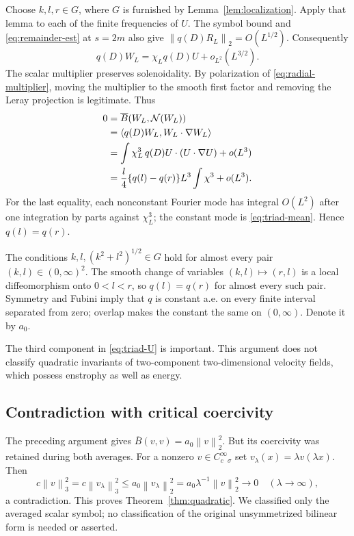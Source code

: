 \documentclass[11pt]{article}
\theoremstyle{remark}
\newcommand{\N}{\mathcal N}
\newcommand{\norm}[1]{\left\lVert#1\right\rVert}
\newcommand{\ip}[2]{\left\langle#1,#2\right\rangle}
\begin{document}
Choose $k,l,r\in G$, where $G$ is furnished by
Lemma~\ref{lem:localization}. Apply that lemma to each of the finite
frequencies of $U$. The symbol bound and \eqref{eq:remainder-est} at
$s=2m$ also give $\norm{q(D)R_L}_2=O(L^{1/2})$. Consequently
\begin{equation}
 q(D)W_L=\chi_Lq(D)U+o_{L^2}(L^{3/2}).\label{eq:main-localized}
\end{equation}
The scalar multiplier preserves solenoidality. By polarization of
\eqref{eq:radial-multiplier}, moving the multiplier to the smooth first
factor and removing the Leray projection is legitimate. Thus
\begin{align}
 0&=\overline B(W_L,\N(W_L))\notag\\
  &=\ip{q(D)W_L}{W_L\cdot\nabla W_L}\notag\\
  &=\int\chi_L^3\,q(D)U\cdot(U\cdot\nabla U)+o(L^3)\notag\\
  &=\frac l4\{q(l)-q(r)\}L^3\int\chi^3+o(L^3).
 \label{eq:triad-conclusion}
\end{align}
For the last equality, each nonconstant Fourier mode has integral
$O(L^2)$ after one integration by parts against $\chi_L^3$; the constant
mode is \eqref{eq:triad-mean}. Hence $q(l)=q(r)$.

The conditions $k,l,(k^2+l^2)^{1/2}\in G$ hold for almost every pair
$(k,l)\in(0,\infty)^2$. The smooth change of variables
$(k,l)\mapsto(r,l)$ is a local diffeomorphism onto $0<l<r$, so
$q(l)=q(r)$ for almost every such pair. Symmetry and Fubini imply that
$q$ is constant a.e. on every finite interval separated from zero;
overlap makes the constant the same on $(0,\infty)$. Denote it by $a_0$.

The third component in \eqref{eq:triad-U} is important. This argument does
not classify quadratic invariants of two-component two-dimensional
velocity fields, which possess enstrophy as well as energy.

\subsection{Contradiction with critical coercivity}
The preceding argument gives $\overline B(v,v)=a_0\norm v_2^2$. But its
coercivity was retained during both averages. For a nonzero
$v\in C_c^\infty{}_\sigma$ set $v_\lambda(x)=\lambda v(\lambda x)$. Then
\begin{equation}
 c\norm v_3^2=c\norm{v_\lambda}_3^2
 \le a_0\norm{v_\lambda}_2^2
 =a_0\lambda^{-1}\norm v_2^2\longrightarrow0
 \quad(\lambda\to\infty),
\end{equation}
a contradiction. This proves Theorem~\ref{thm:quadratic}.
We classified only the averaged scalar symbol; no classification of the
original unsymmetrized bilinear form is needed or asserted.
\end{document}

